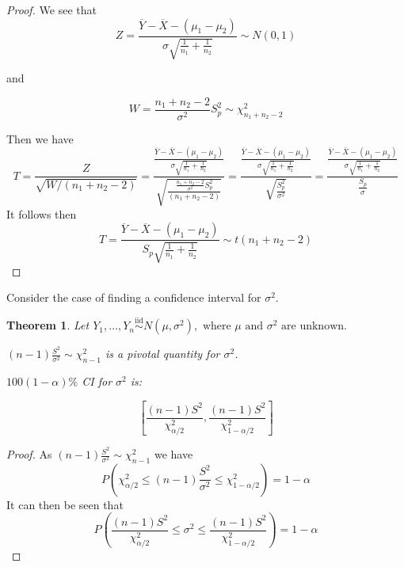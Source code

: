\documentclass[a4paper,12pt]{article}
\theoremstyle{nonitalic}
\newtheorem{theorem}{Theorem}[subsection]
\begin{document}
    \begin{proof}
        We see that
        \[
            Z = \frac{\overline{Y} - \overline{X} - (\mu_1 - \mu_2)}{\sigma \sqrt{\frac{1}{n_1} + \frac{1}{n_2}}} \sim N(0, 1)
        \]

        and

        \[
            W = \frac{n_1 + n_2 - 2}{\sigma^2} S_p^2 \sim \chi^2_{n_1 + n_2 - 2} 
        \]

        Then we have
        \[
            T = \frac{Z}{\sqrt{W/(n_1 + n_2 - 2)}} = \frac{\frac{\overline{Y} - \overline{X} - (\mu_1 - \mu_2)}{\sigma \sqrt{\frac{1}{n_1} + \frac{1}{n_2}}}}{\sqrt{\frac{\frac{n_1 + n_2 - 2}{\sigma^2} S_p^2}{(n_1+n_2-2)}}} = \frac{\frac{\overline{Y} - \overline{X} - (\mu_1 - \mu_2)}{\sigma \sqrt{\frac{1}{n_1} + \frac{1}{n_2}}}}{\sqrt{\frac{S_p^2}{\sigma^2}}} = \frac{\frac{\overline{Y} - \overline{X} - (\mu_1 - \mu_2)}{\sigma \sqrt{\frac{1}{n_1} + \frac{1}{n_2}}}}{\frac{S_p}{\sigma}}
        \]
        It follows then
        \[
            T = \frac{\overline{Y} - \overline{X} - (\mu_1 - \mu_2)}{S_p \sqrt{\frac{1}{n_1} + \frac{1}{n_2}}} \sim t(n_1 + n_2 - 2)
        \]
    \end{proof}

    \bigskip

    Consider the case of finding a confidence interval for $\sigma^2$.

    \begin{theorem}
        Let \(Y_1, \ldots, Y_n \overset{\text{iid}}{\sim} N(\mu, \sigma^2), \text{ where } \mu \text{ and } \sigma^2 \text{ are unknown.}\)

        $(n - 1)\frac{S^2}{\sigma^2} \sim \chi^2_{n-1}$ is a pivotal quantity for \(\sigma^2\).

        \(100(1-\alpha)\%\) CI for \(\sigma^2\) is:

        \[
            \left[ \frac{(n-1)S^2}{\chi^2_{\alpha/2}}, \frac{(n-1)S^2}{\chi^2_{1-\alpha/2}} \right]
        \]
    \end{theorem}

    \begin{proof}
        As $(n - 1)\frac{S^2}{\sigma^2} \sim \chi^2_{n-1}$ we have
        \[
            P\left( \chi^2_{\alpha/2} \leq (n - 1)\frac{S^2}{\sigma^2} \leq \chi^2_{1-\alpha/2} \right) = 1 - \alpha
        \]
        It can then be seen that
        \[
            P\left(\frac{(n - 1)S^2}{\chi^2_{\alpha/2}} \leq \sigma^2 \leq \frac{(n - 1)S^2}{\chi^2_{1-\alpha/2}} \right) = 1 - \alpha
        \]
    \end{proof}
\end{document}

